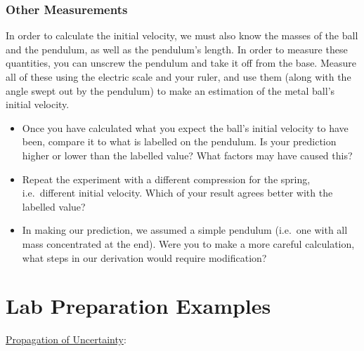 

\subsubsection{Other Measurements}

In order to calculate the initial velocity, we must also know the masses of the ball and the pendulum, as well as the pendulum's length. In order to measure these quantities, you can unscrew the pendulum and take it off from the base. Measure all of these using the electric scale and your ruler, and use them (along with the angle swept out by the pendulum) to make an estimation of the metal ball's initial velocity.\myskip

\begin{itemize}
    \item Once you have calculated what you expect the ball's initial velocity to have been, compare it to what is labelled on the pendulum.  Is your prediction higher or lower than the labelled value?  What factors may have caused this?
    \item Repeat the experiment with a different compression for the spring, i.e.\ different initial velocity. Which of your result agrees better with the labelled value? %
    \item In making our prediction, we assumed a simple pendulum (i.e.\ one with all mass concentrated at the end).  Were you to make a more careful calculation, what steps in our derivation would require modification?
\end{itemize}

\section{Lab Preparation Examples}
\noindent\underline{Propagation of Uncertainty}:\myskip

